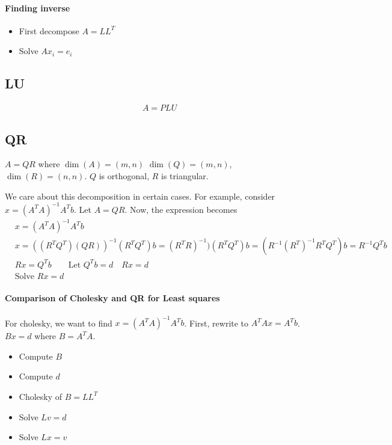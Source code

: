 \documentclass[11pt]{book}
\DeclareMathOperator{\shape}{dim}
\begin{document}
\paragraph{Finding inverse}
\begin{itemize}
\item First decompose $A = LL^T$
\item Solve $A x_i = e_i$
\end{itemize}

\subsection{LU}
\begin{align*}
    &A = PLU
\end{align*}

\subsection{QR}
$A = QR$ where $\shape(A) = (m, n)$ $\shape(Q) = (m, n)$, $\shape(R) =  (n, n)$.
$Q$ is orthogonal, $R$ is triangular.

We care about this decomposition in certain cases. For example, consider
$x = (A^TA)^{-1}A^Tb$. Let $A = QR$. Now, the expression becomes
\begin{align*}
    &x = (A^TA)^{-1}A^Tb \\
    &x = ((R^TQ^T)(QR))^{-1} (R^TQ^T)b = (R^TR)^{-1}) (R^TQ^T) b = (R^{-1} (R^T)^{-1} R^T Q^T) b = R^{-1} Q^T b \\
    &Rx = Q^T b \qquad \text{Let $Q^Tb = d$} \quad Rx = d \\
    &\text{Solve $Rx = d$}
\end{align*}

\paragraph{Comparison of Cholesky and QR for Least squares}
For cholesky, we want to find $x = (A^TA)^{-1}A^Tb$. First, rewrite to
$A^TA x = A^T b$. $Bx = d$ where $B = A^TA$.
\begin{itemize}
    \item Compute $B$
    \item Compute $d$
    \item Cholesky of $B = L L^T$
    \item Solve $Lv = d$
    \item Solve $Lx = v$
\end{itemize}
\end{document}

